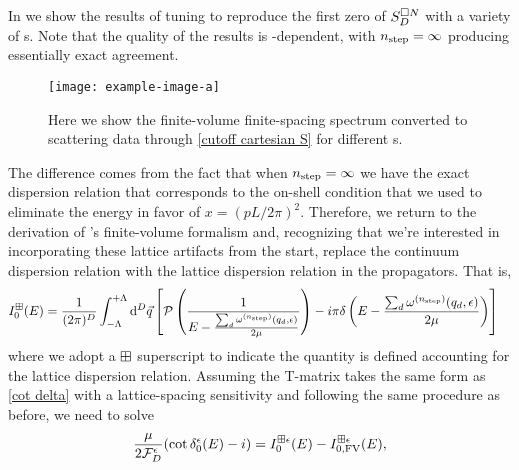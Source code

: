 In  we show the results of tuning to reproduce the first zero of $S_D^{\square N}$ with a variety of {\nstep}s.
Note that the quality of the results is \nstep-dependent, with ${n_\text{step}}=\infty$ producing essentially exact agreement.

\begin{figure}
    \texttt{[image: example-image-a]}
    \caption{Here we show the finite-volume finite-spacing spectrum converted to scattering data through \eqref{cutoff cartesian S} for different {\nstep}s.
    }
    \label{fig:results cutoff cartesian S}
\end{figure}

The difference comes from the fact that when ${n_\text{step}}=\infty$ we have the exact dispersion relation that corresponds to the on-shell condition that we used to eliminate the energy in favor of $x=(pL/2\pi)^2$.
Therefore, we return to the derivation of \Luscher's finite-volume formalism and, recognizing that we're interested in incorporating these lattice artifacts from the start, replace the continuum dispersion relation with the lattice dispersion relation in the propagators.
That is,
\begin{align}
    I_0^{\boxplus}(E)
    &=\frac{1}{(2\pi)^D}
    \int_{-\Lambda}^{+\Lambda}
        \mathrm{d}^D \vec{q}
        \left[
            \mathcal{P} \left( \frac { 1 } { E - \frac{\sum_d \omega^{({n_\text{step}})}(q_d,\epsilon)}{2\mu} } \right)
            -i \pi \delta\left(E - \frac{\sum_d \omega^{({n_\text{step}})}(q_d, \epsilon)}{2\mu}\right)
        \right]
\end{align}
where we adopt a $\boxplus$ superscript to indicate the quantity is defined accounting for the lattice dispersion relation.
Assuming the T-matrix takes the same form as \eqref{cot delta} with a lattice-spacing sensitivity and following the same procedure as before, we need to solve
\begin{equation}
    \frac{\mu}{2\mathcal{F}_D^\epsilon}(\cot \delta_0^\epsilon(E) - i) = I_0^{\boxplus \epsilon}(E) - I_{0,\textrm{FV}}^{\boxplus \epsilon}(E),
\end{equation}
